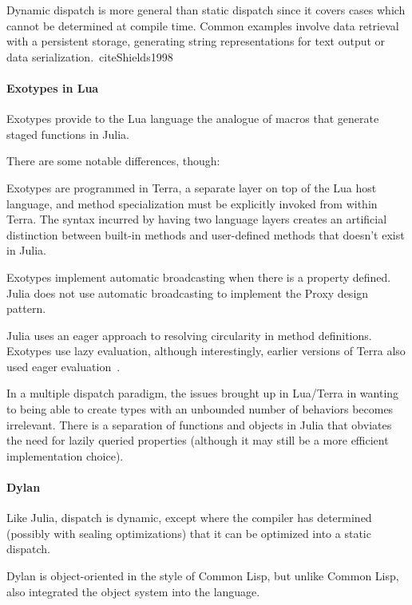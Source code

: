 Dynamic dispatch is more general than static dispatch since it covers cases which cannot be determined at compile time.
Common examples involve data retrieval with a persistent storage, generating string representations for text output or data serialization.~cite{Shields1998}

\paragraph{Exotypes in Lua}
Exotypes\cite{exotypes} provide to the Lua language\cite{lua} the analogue of macros that generate staged functions\cite{stagedfunc} in Julia.

There are some notable differences, though:

Exotypes are programmed in Terra,\cite{terra} a separate layer on top of the Lua host language, and method specialization must be explicitly invoked from within Terra. The syntax incurred by having two language layers creates an artificial distinction between built-in methods and user-defined methods that doesn't exist in Julia.

Exotypes implement automatic broadcasting when there is a  property defined. Julia does not use automatic broadcasting to implement the Proxy design pattern.

Julia uses an eager approach to resolving circularity in method definitions. Exotypes use lazy evaluation, although interestingly, earlier versions of Terra also used eager evaluation~\cite{terra}.


In a multiple dispatch paradigm, the issues brought up in Lua/Terra in wanting to being able to create types with an unbounded number of behaviors becomes irrelevant. There is a separation of functions and objects in Julia that obviates the need for lazily queried properties (although it may still be a more efficient implementation choice).

\paragraph{Dylan}

Like Julia, dispatch is dynamic, except where the compiler has determined (possibly with sealing optimizations) that it can be optimized into a static dispatch.

Dylan is object-oriented in the style of Common Lisp, but unlike Common Lisp, also integrated the object system into the language.

